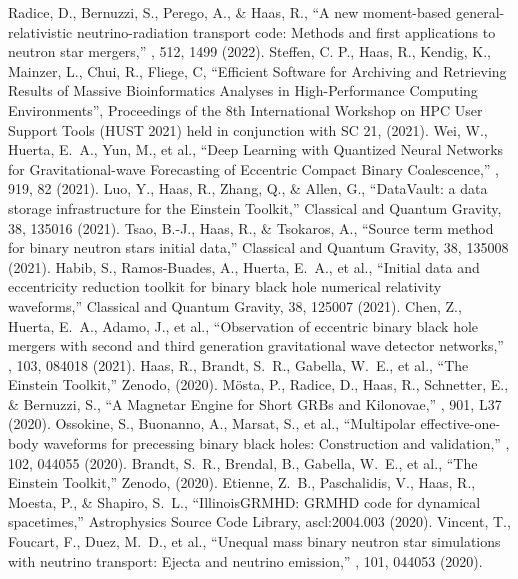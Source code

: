  Radice, D., Bernuzzi, S., Perego, A., \& Haas, R., ``A new moment-based general-relativistic neutrino-radiation transport code: Methods and first applications to neutron star mergers,'' \mnras, 512, 1499 (2022).
 Steffen, C. P., Haas, R., Kendig, K., Mainzer, L., Chui, R., Fliege, C, ``Efficient Software for Archiving and Retrieving Results of Massive Bioinformatics Analyses in High-Performance Computing Environments'', Proceedings of the 8th International Workshop on HPC User Support Tools (HUST 2021) held in conjunction with SC 21, (2021).
 Wei, W., Huerta, E.~A., Yun, M., et al., ``Deep Learning with Quantized Neural Networks for Gravitational-wave Forecasting of Eccentric Compact Binary Coalescence,'' \apj, 919, 82 (2021).
 Luo, Y., Haas, R., Zhang, Q., \& Allen, G., ``DataVault: a data storage infrastructure for the Einstein Toolkit,'' Classical and Quantum Gravity, 38, 135016 (2021).
 Tsao, B.-J., Haas, R., \& Tsokaros, A., ``Source term method for binary neutron stars initial data,'' Classical and Quantum Gravity, 38, 135008 (2021).
 Habib, S., Ramos-Buades, A., Huerta, E.~A., et al., ``Initial data and eccentricity reduction toolkit for binary black hole numerical relativity waveforms,'' Classical and Quantum Gravity, 38, 125007 (2021).
 Chen, Z., Huerta, E.~A., Adamo, J., et al., ``Observation of eccentric binary black hole mergers with second and third generation gravitational wave detector networks,'' \prd, 103, 084018 (2021).
 Haas, R., Brandt, S.~R., Gabella, W.~E., et al., ``The Einstein Toolkit,'' Zenodo, (2020).
 M{\"o}sta, P., Radice, D., Haas, R., Schnetter, E., \& Bernuzzi, S., ``A Magnetar Engine for Short GRBs and Kilonovae,'' \apjl, 901, L37 (2020).
 Ossokine, S., Buonanno, A., Marsat, S., et al., ``Multipolar effective-one-body waveforms for precessing binary black holes: Construction and validation,'' \prd, 102, 044055 (2020).
 Brandt, S.~R., Brendal, B., Gabella, W.~E., et al., ``The Einstein Toolkit,'' Zenodo, (2020).
 Etienne, Z.~B., Paschalidis, V., Haas, R., Moesta, P., \& Shapiro, S.~L., ``IllinoisGRMHD: GRMHD code for dynamical spacetimes,'' Astrophysics Source Code Library, ascl:2004.003 (2020).
 Vincent, T., Foucart, F., Duez, M.~D., et al., ``Unequal mass binary neutron star simulations with neutrino transport: Ejecta and neutrino emission,'' \prd, 101, 044053 (2020).
